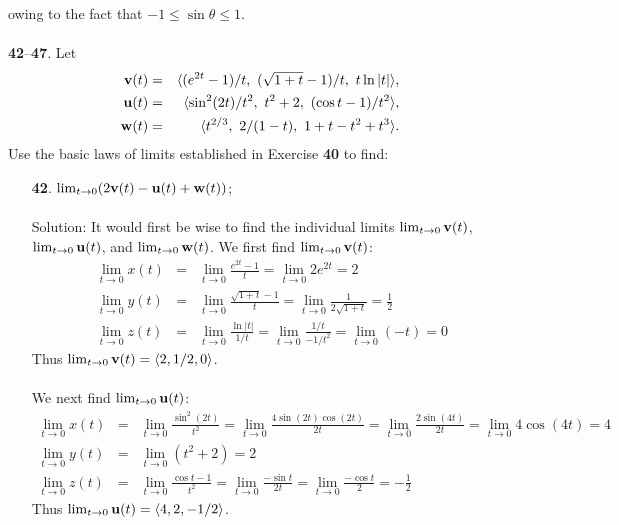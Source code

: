 \documentclass[12pt]{amsbook}
\newcommand{\la}{\langle}
\newcommand{\ra}{\rangle}
\begin{document}
owing to the fact that $-1\leq \sin \theta \leq 1$.
\\
\\
\noindent
{\small {\bf 42}--{\bf 47}}. Let
\begin{eqnarray*}
{\bf v}(t)&=& \la (e^{2t}-1)/t, \ (\sqrt{1+t}-1)/t, \ t\ln|t| \ra, \\
{\bf u}(t)&=& \la \sin^2(2t)/t^2, \ t^2+2, \ (\cos t-1)/t^2 \ra, \\
{\bf w}(t)&=& \la t^{2/3}, \ 2/(1-t), \ 1+t-t^2+t^3\ra.
\end{eqnarray*}
Use the basic laws of limits established in Exercise {\bf 40} to find:
\begin{enumerate}
  \item[{\small\bf 42}.] $\lim_{t\rightarrow 0}(2{\bf v}(t)-{\bf u}(t)+{\bf w}(t))$;
  \\
  \\
  {\sc Solution}: It would first be wise to find the individual limits $\lim_{t\rightarrow 0}{\bf v}(t)$, $\lim_{t\rightarrow 0}{\bf u}(t)$, and $\lim_{t\rightarrow 0}{\bf w}(t)$. We first find $\lim_{t\rightarrow 0}{\bf v}(t)$:
  \begin{eqnarray*}
  \lim_{t\rightarrow 0}x(t)&=&\lim_{t\rightarrow 0}\frac{e^{2t}-1}{t}=\lim_{t\rightarrow 0}2e^{2t}=2\\
  \lim_{t\rightarrow 0}y(t)&=&\lim_{t\rightarrow 0}\frac{\sqrt{1+t}-1}{t}=\lim_{t\rightarrow 0}\frac{1}{2\sqrt{1+t}}=\frac{1}{2}\\
  \lim_{t\rightarrow 0}z(t)&=&\lim_{t\rightarrow 0}\frac{\ln|t|}{1/t}=\lim_{t\rightarrow 0}\frac{1/t}{-1/t^2}=\lim_{t\rightarrow 0}(-t)=0
  \end{eqnarray*}
  Thus $\lim_{t\rightarrow 0}{\bf v}(t)=\la 2,1/2,0 \ra$.
  \\
  \\
  We next find $\lim_{t\rightarrow 0}{\bf u}(t)$:
  \begin{eqnarray*}
  \lim_{t\rightarrow 0}x(t)&=&\lim_{t\rightarrow 0}\frac{\sin^2(2t)}{t^2}=\lim_{t\rightarrow 0}\frac{4\sin(2t)\cos(2t)}{2t}=\lim_{t\rightarrow 0}\frac{2\sin(4t)}{2t}=\lim_{t\rightarrow 0}4\cos(4t)=4\\
  \lim_{t\rightarrow 0}y(t)&=&\lim_{t\rightarrow 0}(t^2+2)=2\\
  \lim_{t\rightarrow 0}z(t)&=&\lim_{t\rightarrow 0}\frac{\cos t-1}{t^2}=\lim_{t\rightarrow 0}\frac{-\sin t}{2t}=\lim_{t\rightarrow 0}\frac{-\cos t}{2}=-\frac{1}{2}
  \end{eqnarray*}
  Thus $\lim_{t\rightarrow 0}{\bf u}(t)=\la 4,2,-1/2 \ra$.
  \\

\end{enumerate}
\end{document}
